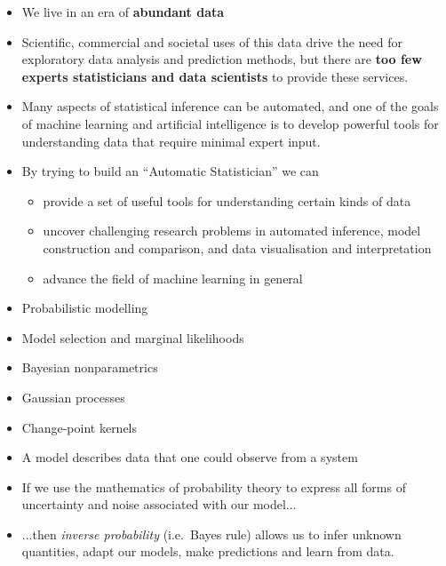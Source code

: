 \begin{itemize}
\item We live in an era of {\bf abundant data}
\item Scientific, commercial and societal uses of this data drive the
  need for exploratory data analysis and
  prediction methods, but there are {\bf too few experts statisticians and
  data scientists} to provide these services.
\item Many aspects of statistical inference can be automated, and one
  of the goals of machine learning and artificial intelligence is to
  develop powerful tools for understanding data that require minimal
  expert input. 
\item By trying to build an ``Automatic Statistician'' we can
\begin{itemize}
\item provide a set of useful tools for understanding certain kinds of
  data
\item uncover challenging research problems in automated inference,
  model construction and comparison, and data visualisation and
  interpretation 
\item advance the field of machine learning in general
\end{itemize}

\end{itemize}


\begin{itemize}
\item Probabilistic modelling
\item Model selection and marginal likelihoods
\item Bayesian nonparametrics
\item Gaussian processes
\item Change-point kernels
\end{itemize}


\parbox{0.95\textwidth}{
\large
\begin{itemize}
\item A model describes data that one could observe from a system
\item If we use the mathematics of probability theory to express all
  forms of uncertainty and noise associated with our model...
\item ...then {\it inverse probability} (i.e.\ Bayes rule) allows us
  to infer unknown quantities, adapt our models, make predictions and
  learn from data.
\end{itemize}
}


